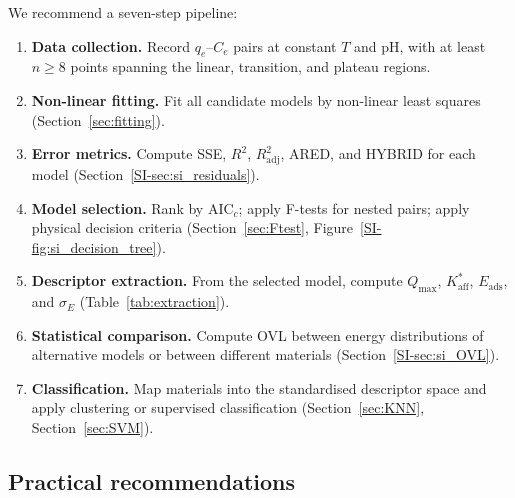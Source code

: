 \documentclass[journal=jacsat,manuscript=article]{achemso}
\begin{document}
	We recommend a seven-step pipeline:
	\begin{enumerate}
		\item \textbf{Data collection.} Record $q_e$--$C_e$ pairs at constant $T$ and pH, with at least $n \geq 8$ points spanning the linear, transition, and plateau regions.
		\item \textbf{Non-linear fitting.} Fit all candidate models by non-linear least squares (Section~\ref{sec:fitting}).
		\item \textbf{Error metrics.} Compute SSE, $R^2$, $R^2_{\mathrm{adj}}$, ARED, and HYBRID for each model (Section~\ref{SI-sec:si_residuals}).
		\item \textbf{Model selection.} Rank by AIC$_c$; apply F-tests for nested pairs; apply physical decision criteria (Section~\ref{sec:Ftest}, Figure~\ref{SI-fig:si_decision_tree}).
		\item \textbf{Descriptor extraction.} From the selected model, compute $Q_{\max}$, $K_{\mathrm{aff}}^{\ast}$, $E_{\mathrm{ads}}$, and $\sigma_E$ (Table~\ref{tab:extraction}).
		\item \textbf{Statistical comparison.} Compute OVL between energy distributions of alternative models or between different materials (Section~\ref{SI-sec:si_OVL}).
		\item \textbf{Classification.} Map materials into the standardised descriptor space and apply clustering or supervised classification (Section~\ref{sec:KNN}, Section~\ref{sec:SVM}).
	\end{enumerate}

	\subsection{Practical recommendations}
	\label{sec:practical}
\end{document}
